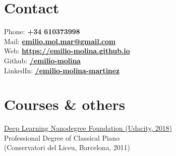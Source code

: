 \documentclass[]{deedy-resume-openfont}
\begin{document}
%
%
\lastupdated

%
%

%
%

\begin{minipage}[t]{0.30\textwidth} 



\section{Contact} 
Phone: {\bf +34 610373998}\\
Mail: \href{mailto:emilio.mol.mar@gmail.com}{\bf emilio.mol.mar@gmail.com}\\
Web: \href{https://emilio-molina.github.io/}{\bf https://emilio-molina.github.io}\\
Github: \href{https://github.com/emilio-molina}{\bf /emilio-molina} \\
LinkedIn: \href{https://www.linkedin.com/in/emilio-molina-martinez/}{\bf /emilio-molina-martinez}




\vspace{0.5cm}
\section{Courses \& others}
\href{https://confirm.udacity.com/ZW9LLAGZ}{Deep Learning Nanodegree Foundation (Udacity, 2018)} \\
Professional Degree of Classical Piano\\(Conservatori del Liceu, Barcelona, 2011)
\vspace{0.5cm}


\end{minipage}
\end{document}
